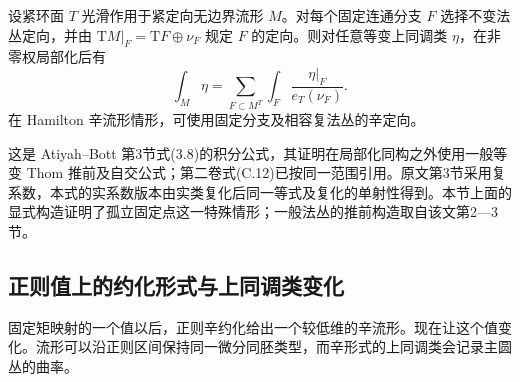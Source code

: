 \begin{theorem}[等变积分局部化]\label{g4:thm:1206:fixed-component-localization}
	设紧环面 \(T\) 光滑作用于紧定向无边界流形 \(M\)。对每个固定连通分支 \(F\) 选择不变法丛定向，并由 \(\mathrm{T}M|_F=\mathrm{T}F\oplus\nu_F\) 规定 \(F\) 的定向。则对任意等变上同调类 \(\eta\)，在非零权局部化后有
	\begin{equation}\label{g4:eq:1206:fixed-component-localization}
		\int_M\eta=\sum_{F\subset M^T}\int_F\frac{\eta|_F}{e_T(\nu_F)}.
	\end{equation}
	在 Hamilton 辛流形情形，可使用固定分支及相容复法丛的辛定向。
\end{theorem}

这是 Atiyah--Bott 第3节式(3.8)的积分公式，其证明在局部化同构之外使用一般等变 Thom 推前及自交公式；第二卷式(C.12)已按同一范围引用。原文第3节采用复系数，本式的实系数版本由实类复化后同一等式及复化的单射性得到。本节上面的显式构造证明了孤立固定点这一特殊情形；一般法丛的推前构造取自该文第2—3节。\cite[第5、8--9页，式(2.19)、(3.7)--(3.8)]{AtiyahBott1984MomentMap}

\subsection{正则值上的约化形式与上同调类变化}
\label{g4:subsec:1206:03}
固定矩映射的一个值以后，正则辛约化给出一个较低维的辛流形。现在让这个值变化。流形可以沿正则区间保持同一微分同胚类型，而辛形式的上同调类会记录主圆丛的曲率。

